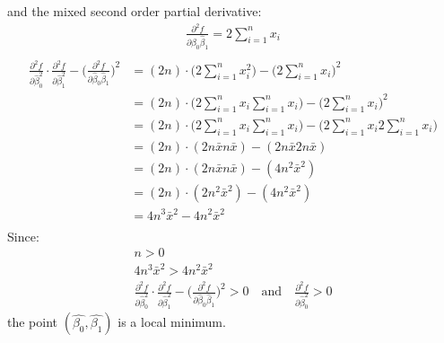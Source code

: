\documentclass{article}
\begin{document}
and the mixed second order partial derivative:
\begin{gather*}
\frac{\partial^2f}{\partial \hat{\beta}_{0} \hat{\beta}_{1}} = 2\sum_{i=1}^{n}x_i \\
\end{gather*}
\begin{align*}
    \frac{\partial^2f}{\partial \hat{\beta}_{0}^2} \cdot \frac{\partial^2f}{\partial \hat{\beta}_{1}^2} - \Bigg( \frac{\partial^2f}{\partial \hat{\beta}_{0} \hat{\beta}_{1}}\Bigg)^2 & = (2n)\cdot\Bigg(2\sum_{i=1}^{n}x_i^2\Bigg)-\Bigg(2\sum_{i=1}^{n}x_i\Bigg)^2 \\
    & = (2n)\cdot\Bigg(2\sum_{i=1}^{n}x_i\sum_{i=1}^{n}x_i\Bigg)-\Bigg(2\sum_{i=1}^{n}x_i\Bigg)^2 \\
    & = (2n)\cdot\Bigg(2\sum_{i=1}^{n}x_i\sum_{i=1}^{n}x_i\Bigg)-\Bigg(2\sum_{i=1}^{n}x_{i}2\sum_{i=1}^{n}x_i\Bigg) \\    
    & = (2n)\cdot(2n\bar{x}n\bar{x})-(2n\bar{x}2n\bar{x}) \\  
    & = (2n)\cdot(2n\bar{x}n\bar{x})-(4n^2\bar{x}^2) \\      
    & = (2n)\cdot(2n^2\bar{x}^2)-(4n^2\bar{x}^2) \\   
    & = 4n^3\bar{x}^2-4n^2\bar{x}^2 \\  
\end{align*}
Since:
\begin{gather*}
n > 0 \\
4n^3\bar{x}^2 > 4n^2\bar{x}^2 \\
\frac{\partial^2f}{\partial \hat{\beta}_{0}^2} \cdot \frac{\partial^2f}{\partial \hat{\beta}_{1}^2} - \Bigg( \frac{\partial^2f}{\partial \hat{\beta}_{0} \hat{\beta}_{1}}\Bigg)^2 > 0  \quad \textrm{and} \quad \frac{\partial^2f}{\partial \hat{\beta}_{0}^2} > 0
\end{gather*}
the point $(\hat{\beta_{0}}, \hat{\beta_{1}})$ is a local minimum.
\end{document}
